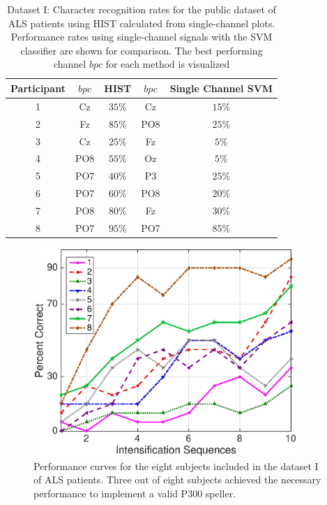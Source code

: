 \begin{table}[h!]
\caption[Dataset I - Single Channel Character Recognition Rates]{Dataset I: Character recognition rates for the public dataset of ALS patients using HIST calculated from single-channel plots.  Performance rates using single-channel signals with the SVM classifier are shown for comparison.  The best performing channel $bpc$ for each method is visualized}
\centering
\begin{tabular}{c|cc|cc}
\toprule
\textbf{Participant}	&  $bpc$ 	&  HIST &  $bpc$	&  Single Channel SVM \\
\midrule
1     &     Cz   &   $35\%$    &  Cz   & $15\%$   \\
2     &     Fz   &   $85\%$      &  PO8   & $25\%$   \\
3     &     Cz   &   $25\%$    &  Fz   & $5\%$   \\
4     &     PO8 &   $55\%$   &  Oz   & $5\%$    \\
5     &     PO7 &   $40\%$    &  P3   & $25\%$   \\
6     &     PO7 &   $60\%$  &  PO8   & $20\%$    \\
7     &     PO8 &   $80\%$   &  Fz   & $30\%$     \\
8     &     PO7 &   $95\%$     &  PO7   & $85\%$ \\

\end{tabular}
\label{tab:resultsals}
\end{table}


\begin{figure}[h!]
\centering
\includegraphics[width=10cm]{images/performance.eps}
\caption[Dataset I ALS Patients Dataset P300 Performance Curves]{Performance curves for the eight subjects included in the dataset I of ALS patients.  Three out of eight subjects achieved the necessary performance to implement a valid P300 speller.}
\label{fig:performance}
\end{figure}

